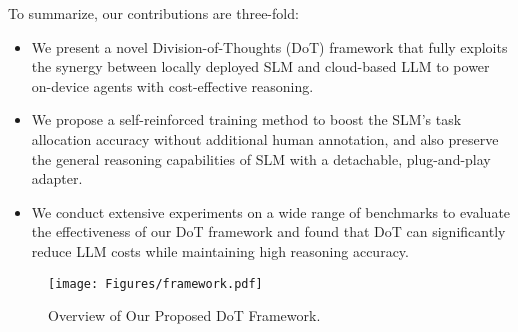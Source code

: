 To summarize, our contributions are three-fold:

\begin{itemize}
    \item We present a novel Division-of-Thoughts (DoT) framework that fully exploits the synergy between locally deployed SLM and cloud-based LLM to power on-device agents with cost-effective reasoning. 

    
    \item We propose a self-reinforced training method to boost the SLM's task allocation accuracy without additional human annotation, and also preserve the general reasoning capabilities of SLM with a detachable, plug-and-play adapter.   

    \item We conduct extensive experiments on a wide range of benchmarks to evaluate the effectiveness of our DoT framework and found that DoT can significantly reduce LLM costs while maintaining high reasoning accuracy.
    
\end{itemize}



\begin{figure*}
    \centering
    \texttt{[image: Figures/framework.pdf]}
    \vspace{-3mm}
    \caption{Overview of Our Proposed DoT Framework.}
    \label{fig:framework}
\end{figure*}